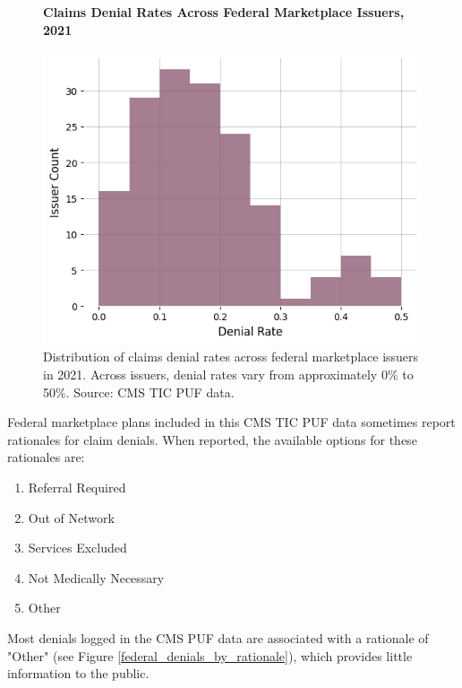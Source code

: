 \documentclass[12pt, a4paper]{report}
\begin{document}
\begin{figure}
	\centering
	\textbf{Claims Denial Rates Across Federal Marketplace Issuers, 2021}\par\medskip
	\includegraphics[width=0.85\columnwidth]{images/cms_puf/denial_rates_all_insurers.png}
	\caption{Distribution of claims denial rates across federal marketplace issuers in 2021. Across issuers, denial rates vary from approximately 0\% to 50\%. Source: CMS TIC PUF data.}
	\label{federal_denial_rate_hist}
\end{figure}

Federal marketplace plans included in this CMS TIC PUF data sometimes report rationales for claim denials. When reported, the available options for these rationales are:\\

\begin{enumerate}
	\item Referral Required
	\item Out of Network
	\item Services Excluded
	\item Not Medically Necessary
	\item Other
\end{enumerate}

Most denials logged in the CMS PUF data are associated with a rationale of "Other" (see Figure \ref{federal_denials_by_rationale}), which provides little information to the public.\\
\end{document}
